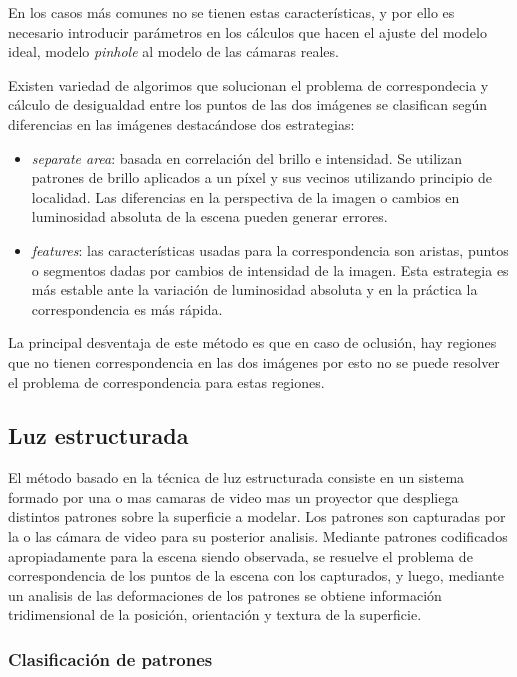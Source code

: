 En los casos más comunes no se tienen estas características, y por ello es necesario introducir parámetros en los cálculos que hacen el ajuste del modelo ideal, modelo \emph{pinhole} al modelo de las cámaras reales. 

Existen variedad de algorimos que solucionan el problema de correspondecia y cálculo de desigualdad entre los puntos de las dos imágenes se clasifican según diferencias en las imágenes destacándose dos estrategias:
\begin{itemize}
   \item \emph{separate area}: basada en correlación del brillo e intensidad. Se utilizan patrones de brillo aplicados a un píxel y sus vecinos utilizando principio de localidad. Las diferencias en la perspectiva de la imagen o cambios en luminosidad absoluta de la escena pueden generar errores.
   \item \emph{features}: las características usadas para la correspondencia son aristas, puntos o segmentos dadas por cambios de intensidad de la imagen. Esta estrategia es más estable ante la variación de luminosidad absoluta y en la práctica la correspondencia es más rápida.
\end{itemize}
La principal desventaja de este método es que en caso de oclusión, hay regiones que no tienen correspondencia en las dos imágenes por esto no se puede resolver el problema de correspondencia para estas regiones.


\subsection{Luz estructurada}

El método basado en la técnica de luz estructurada consiste en un sistema formado por una o mas camaras de video mas un proyector que despliega distintos patrones sobre la superficie a modelar. Los patrones son capturadas por la o las cámara de video para su posterior analisis. Mediante patrones codificados apropiadamente para la escena siendo observada, se resuelve el problema de correspondencia de los puntos de la escena con los capturados, y luego, mediante un analisis de las deformaciones de los patrones se obtiene información tridimensional de la posición, orientación y textura de la superficie\cite{SLightPatterns}.

\subsubsection{Clasificación de patrones}

